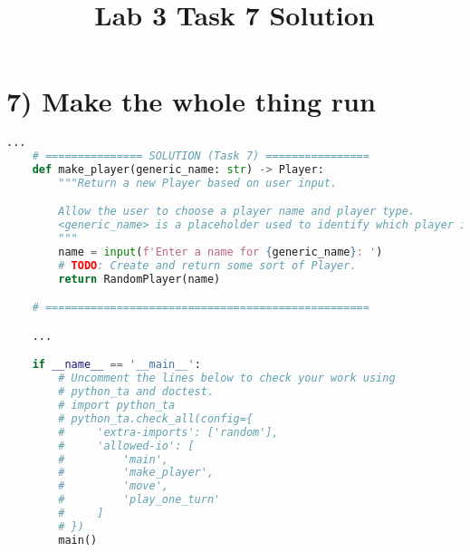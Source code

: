 \documentclass[12pt]{article}
\begin{document}
\title{Lab 3 Task 7 Solution}
\date{}
\maketitle

\section*{7) Make the whole thing run}

\begin{lstlisting}[language=Python, caption={task\_7\_solution.py},captionpos=b]
    ...
    # =============== SOLUTION (Task 7) ================
    def make_player(generic_name: str) -> Player:
        """Return a new Player based on user input.

        Allow the user to choose a player name and player type.
        <generic_name> is a placeholder used to identify which player is being made.
        """
        name = input(f'Enter a name for {generic_name}: ')
        # TODO: Create and return some sort of Player.
        return RandomPlayer(name)

    # ==================================================

    ...

    if __name__ == '__main__':
        # Uncomment the lines below to check your work using
        # python_ta and doctest.
        # import python_ta
        # python_ta.check_all(config={
        #     'extra-imports': ['random'],
        #     'allowed-io': [
        #         'main',
        #         'make_player',
        #         'move',
        #         'play_one_turn'
        #     ]
        # })
        main()
\end{lstlisting}
\end{document}
